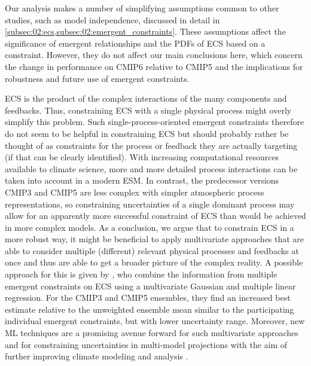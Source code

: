 Our analysis makes a number of simplifying assumptions common to other studies,
such as model independence, discussed in detail in
\cref{subsec:02:ecs,subsec:02:emergent_constraints}. These assumptions affect
the significance of emergent relationships and the \acp{PDF} of \ac{ECS} based
on a constraint. However, they do not affect our main conclusions here, which
concern the change in performance on \acs{CMIP}6 relative to \acs{CMIP}5 and
the implications for robustness and future use of emergent constraints.

\Ac{ECS} is the product of the complex interactions of the many components and
feedbacks. Thus, constraining \ac{ECS} with a single physical process might
overly simplify this problem. Such single-process-oriented emergent constraints
therefore do not seem to be helpful in constraining \ac{ECS} but should
probably rather be thought of as constraints for the process or feedback they
are actually targeting (if that can be clearly identified). With increasing
computational resources available to climate science, more and more detailed
process interactions can be taken into account in a modern \ac{ESM}. In
contrast, the predecessor versions \acs{CMIP}3 and \acs{CMIP}5 are less complex
with simpler atmospheric process representations, so constraining uncertainties
of a single dominant process may allow for an apparently more successful
constraint of \ac{ECS} than would be achieved in more complex models. As a
conclusion, we argue that to constrain \ac{ECS} in a more robust way, it might
be beneficial to apply multivariate approaches that are able to consider
multiple (different) relevant physical processes and feedbacks at once and thus
are able to get a broader picture of the complex reality. A possible approach
for this is given by \textcite{Bretherton2020}, who combine the information
from multiple emergent constraints on \ac{ECS} using a multivariate Gaussian
and multiple linear regression. For the \acs{CMIP}3 and \acs{CMIP}5 ensembles,
they find an increased best estimate relative to the unweighted ensemble mean
similar to the participating individual emergent constraints, but with lower
uncertainty range. Moreover, new \ac{ML} techniques are a promising avenue
forward for such multivariate approaches and for constraining uncertainties in
multi-model projections 
with the aim of further improving climate modeling and analysis
\autocite{Reichstein2019}.
